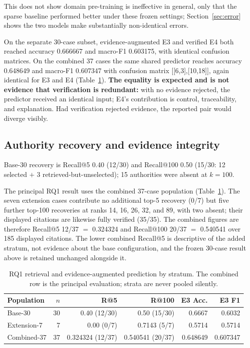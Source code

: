 \documentclass[conference]{IEEEtran}
\begin{document}
This does not show domain pre-training is ineffective in general, only that the
sparse baseline performed better under these frozen settings; Section~\ref{sec:error}
shows the two models make substantially non-identical errors.

On the separate 30-case subset, evidence-augmented E3 and verified E4 both
reached accuracy 0.666667 and macro-F1 0.603175, with identical confusion matrices.
On the combined 37 cases the same shared predictor reaches accuracy 0.648649 and
macro-F1 0.607347 with confusion matrix [[6,3],[10,18]], again identical for E3
and E4 (Table~\ref{tab:rq1strata}).
\textbf{The equality is expected and is not evidence that verification is
redundant:} with no evidence rejected, the predictor received an identical
input; E4's contribution is control, traceability, and explanation. Had
verification rejected evidence, the reported pair would diverge visibly.

\subsection{Authority recovery and evidence integrity}

Base-30 recovery is Recall@5 0.40 (12/30) and Recall@100 0.50 (15/30: 12
selected $+$ 3 retrieved-but-unselected); 15 authorities were absent at
$k{=}100$.

The principal RQ1 result uses the combined 37-case population
(Table~\ref{tab:rq1strata}). The seven extension cases contribute no
additional top-5 recovery (0/7) but five further top-100 recoveries at ranks
14, 16, 26, 32, and 89, with two absent; their displayed citations are
likewise fully verified (35/35). The combined figures are therefore Recall@5
12/37 $=$ 0.324324 and Recall@100 20/37 $=$ 0.540541 over 185 displayed
citations. The lower combined Recall@5 is descriptive of the added stratum,
not evidence about the base configuration, and the frozen 30-case result
above is retained unchanged alongside it.

\begin{table}[t]
\caption{RQ1 retrieval and evidence-augmented prediction by stratum. The
combined row is the principal evaluation; strata are never pooled silently.}
\label{tab:rq1strata}
\centering
\footnotesize
\setlength{\tabcolsep}{2pt}
\begin{tabular}{lrrrrr}
\toprule
\textbf{Population} & \textbf{$n$} & \textbf{R@5} & \textbf{R@100} &
\textbf{E3 Acc.} & \textbf{E3 F1} \\
\midrule
Base-30          & 30 & 0.40 (12/30) & 0.50 (15/30)   & 0.6667 & 0.6032 \\
Extension-7      & 7  & 0.00 (0/7)   & 0.7143 (5/7)   & 0.5714 & 0.5714 \\
Combined-37      & 37 & 0.324324 (12/37) & 0.540541 (20/37) & 0.648649 & 0.607347 \\
\bottomrule
\end{tabular}
\end{table}
\end{document}
